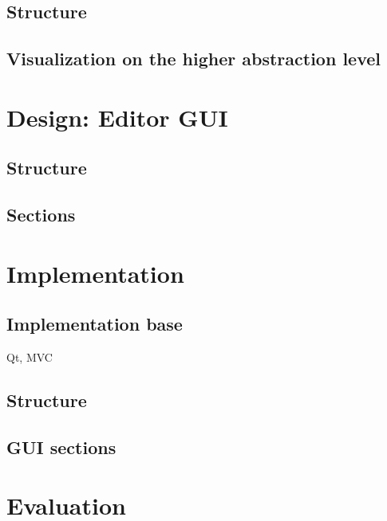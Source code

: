 \documentclass[twoside, openright, 12pt]{book}
\begin{document}
\section{Structure}
\label{gsl_structure}


\section{Visualization on the higher abstraction level}
\label{higher_abstraction_level}




\cleardoublepage
\chapter{Design: Editor GUI}
\label{editor_design}


\section{Structure}
\label{editor_structure}


\section{Sections}
\label{editor_sections}




\cleardoublepage
\chapter{Implementation}
\label{implementation}
	
	
\section{Implementation base}
\label{implementation_base}
Qt, MVC

\section{Structure}
\label{implementation_structure}
	
	
\section{GUI sections}
\label{implementation_sections}




\cleardoublepage
\chapter{Evaluation}
\label{evaluation}
\end{document}

